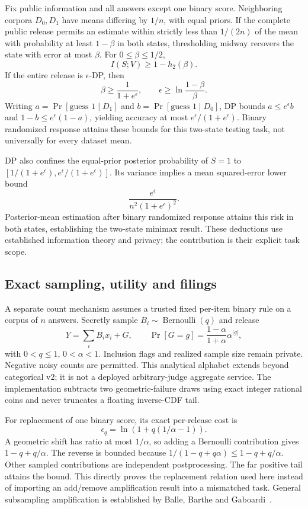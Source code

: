 \documentclass[10pt,twocolumn]{article}
\begin{document}
Fix public information and all answers except one binary score. Neighboring corpora $D_0,D_1$ have means differing by $1/n$, with equal priors. If the complete public release permits an estimate within strictly less than $1/(2n)$ of the mean with probability at least $1-\beta$ in both states, thresholding midway recovers the state with error at most $\beta$. For $0\leq\beta\leq1/2$,
\[
I(S;V)\geq1-h_2(\beta).
\]
If the entire release is $\epsilon$-DP, then
\[
\beta\geq\frac1{1+e^\epsilon},\qquad
\epsilon\geq\ln\frac{1-\beta}{\beta}.
\]
Writing $a=\Pr[\text{guess }1\mid D_1]$ and $b=\Pr[\text{guess }1\mid D_0]$, DP bounds $a\leq e^\epsilon b$ and $1-b\leq e^\epsilon(1-a)$, yielding accuracy at most $e^\epsilon/(1+e^\epsilon)$. Binary randomized response attains these bounds for this two-state testing task, not universally for every dataset mean.

DP also confines the equal-prior posterior probability of $S=1$ to $[1/(1+e^\epsilon),e^\epsilon/(1+e^\epsilon)]$. Its variance implies a mean squared-error lower bound
\[
\frac{e^\epsilon}{n^2(1+e^\epsilon)^2}.
\]
Posterior-mean estimation after binary randomized response attains this risk in both states, establishing the two-state minimax result. These deductions use established information theory and privacy; the contribution is their explicit task scope.

\subsection{Exact sampling, utility and filings}
A separate count mechanism assumes a trusted fixed per-item binary rule on a corpus of $n$ answers. Secretly sample $B_i\sim\operatorname{Bernoulli}(q)$ and release
\[
Y=\sum_iB_ix_i+G,\qquad
\Pr[G=g]=\frac{1-\alpha}{1+\alpha}\alpha^{|g|},
\]
with $0<q\leq1$, $0<\alpha<1$. Inclusion flags and realized sample size remain private. Negative noisy counts are permitted. This analytical alphabet extends beyond categorical v2; it is not a deployed arbitrary-judge aggregate service. The implementation subtracts two geometric-failure draws using exact integer rational coins and never truncates a floating inverse-CDF tail.

For replacement of one binary score, its exact per-release cost is
\[
\epsilon_q=\ln\!\left(1+q(1/\alpha-1)\right).
\]
A geometric shift has ratio at most $1/\alpha$, so adding a Bernoulli contribution gives $1-q+q/\alpha$. The reverse is bounded because $1/(1-q+q\alpha)\leq1-q+q/\alpha$. Other sampled contributions are independent postprocessing. The far positive tail attains the bound. This directly proves the replacement relation used here instead of importing an add/remove amplification result into a mismatched task. General subsampling amplification is established by Balle, Barthe and Gaboardi~\cite{balle}.
\end{document}
